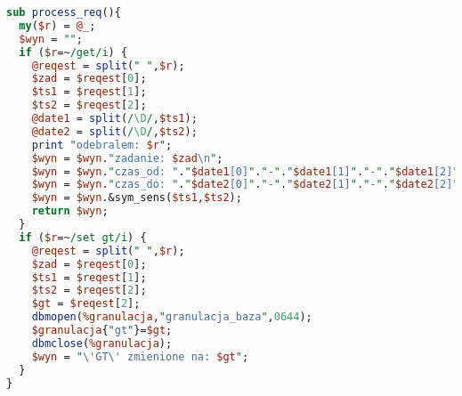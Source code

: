 \begin{small}
\begin{lstlisting}[language=perl, frame=lines, caption=Przetwarzanie żądania - procedura \texttt{process\_req()}\label{req}., firstnumber=86]
sub process_req(){	
  my($r) = @_;
  $wyn = "";
  if ($r=~/get/i) {
	@reqest = split(" ",$r);
	$zad = $reqest[0];
	$ts1 = $reqest[1];
	$ts2 = $reqest[2];
	@date1 = split(/\D/,$ts1);
	@date2 = split(/\D/,$ts2);
	print "odebralem: $r"; 
	$wyn = $wyn."zadanie: $zad\n";
	$wyn = $wyn."czas_od: "."$date1[0]"."-"."$date1[1]"."-"."$date1[2]"."_"."$date1[3]".":"."$date1[4]".":"."$date1[5]"."\n";
	$wyn = $wyn."czas_do: "."$date2[0]"."-"."$date2[1]"."-"."$date2[2]"."_"."$date2[3]".":"."$date2[4]".":"."$date2[5]"."\n";		
	$wyn = $wyn.&sym_sens($ts1,$ts2);
	return $wyn;
  }
  if ($r=~/set gt/i) {
	@reqest = split(" ",$r);
	$zad = $reqest[0];
	$ts1 = $reqest[1];
	$ts2 = $reqest[2];
	$gt = $reqest[2];
	dbmopen(%granulacja,"granulacja_baza",0644);
	$granulacja{"gt"}=$gt;
	dbmclose(%granulacja);
	$wyn = "\'GT\' zmienione na: $gt";
  }		
}	
\end{lstlisting} 
\end{small}
